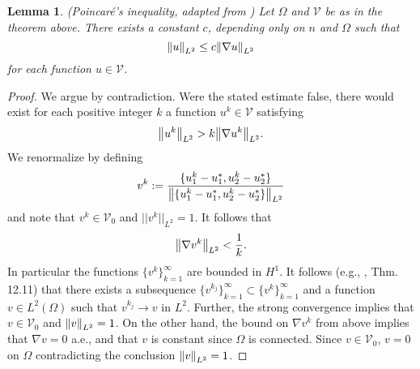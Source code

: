 \documentclass[11pt]{article}
\newtheorem{lemma}[theorem]{Lemma}
\begin{document}
\begin{lemma}(Poincar{\'e}'s inequality, adapted from \cite{evans}) 
\label{poincare}
Let $\Omega$ and ${\mathcal V}$ be as in the theorem above.  There exists a constant $c$, depending only on $n$ and $\Omega$ such that 
$$
\norm{u}_{L^2} \leq c\norm{\nabla u}_{L^2}
$$
for each function $u\in \mathcal{V}$.
\end{lemma}
\begin{proof}
We argue by contradiction. Were the stated estimate false, there would exist for each positive integer $k$ a function $u^k\in \mathcal{V}$ satisfying 
$$
\norm{u^k}_{L^2} > k \norm{\nabla u^k}_{L^2}.
$$
We renormalize by defining 
$$
v^k:=\frac{\{u^k_1-u^*_1,u^k_2-u^*_2\} }{\norm{\{u^k_1-u^*_1,u^k_2-u^*_2\}}_{L^2}} 
$$
and note that $v^k \in {\mathcal V}_0$ and $||v^k||_{L^2} = 1$.  It follows that 
$$
\norm{\nabla v^k}_{L^2}<\frac{1}{k}.
$$
In particular the functions $\{v^k\}_{k=1}^\infty$ are bounded in $H^1$.  It follows (e.g., \cite{dacorognadirect}, Thm. 12.11) that there exists a subsequence $\{v^{k_j}\}_{k=1}^\infty\subset \{v^k\}_{k=1}^\infty$ and a function $v\in L^{2}(\Omega)$ such that 
$
v^{k_j}\rightarrow v\text{   in }L^2.
$
Further, the strong convergence implies that $v \in {\mathcal V}_0$ and $\norm{v}_{L^2}=1$.
On the other hand, the bound on $\nabla v^k$ from above implies that $\nabla v =0$ a.e., and that $v$ is constant since $\Omega$ is connected.  Since $v \in {\mathcal V}_0$, $v=0$ on $\Omega$ contradicting the conclusion $\norm{v}_{L^2} =1$.


\end{proof}
\end{document}
